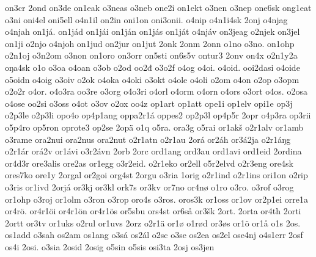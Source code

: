 {    on3cr
    2ond
    on3de
    on1eak
    o3neas
    o3neb
    one2i
    on1ekt
    o3nen
    o3nep
    one6sk
    ong1eat
    o3ni
    oni4el
    oni5ell
    o4n1il
    on2in
    oni1on
    oni3onii.
    o4nip
    o4n1i4sk
    2onj
    o4njag
    o4njah
    on1já.
    on1jád
    on1jái
    on1ján
    on1jás
    on1ját
    o4njáv
    on3jeag
    o2njek
    on3jel
    on1ji
    o2njo
    o4njoh
    on1jud
    on2jur
    on1jut
    2onk
    2onm
    2onn
    o1no
    o3no.
    on1ohp
    o2n1oj
    o3n2om
    o3non
    on1oro
    on3orr
    on5sti
    on6s5v
    ontur3
    2onv
    on4x
    o2n1y2a
    oŋa4sk
    o1o
    o3oa
    o4oan
    o3ob
    o2od
    oo2đ
    o3o2f
    o4og
    o4oi.
    o4oid.
    ooi2dasi
    o4oide
    o5oidn
    o4oig
    o3oiv
    o2ok
    o4oka
    o4oki
    o3okt
    o4ole
    o4oli
    o2om
    o4on
    o2op
    o3opm
    o2o2r
    o4or.
    o4o3ra
    oo3re
    o3org
    o4o3ri
    o4orl
    o4orm
    o4orn
    o4ors
    o3ort
    o4os.
    o2osa
    o4ose
    oo2si
    o3oss
    o4ot
    o3ov
    o2ox
    oo4z
    op1art
    op1att
    ope1i
    op1elv
    opi1e
    op3j
    o2p3le
    o2p3li
    opo4o
    op4p1ang
    oppa2r1á
    oppes2
    op2p3l
    op4p5r
    2opr
    o4p3ra
    op3rii
    o5p4ro
    op5ron
    oprote3
    op2se
    2opä
    o1q
    o5ra.
    ora3g
    o5rai
    or1akš
    o2r1alv
    or1amb
    o3rame
    ora2nui
    ora2nus
    ora2nut
    o2r1atn
    o2r1au
    2orá
    or2áh
    or3á2ja
    o2r1áŋg
    o2r1ár
    orá2v
    or1ávi
    o3r2ávn
    2orb
    2orc
    ord1ang
    ord3au
    ord1avi
    ord1eid
    2ordina
    or4d3r
    ore3alis
    ore2as
    or1egg
    o3r2eid.
    o2r1eko
    or2ell
    o5r2elvd
    o2r3eng
    ore4sk
    ores7ko
    ore1y
    2orgal
    or2goi
    org4st
    2orgu
    o3ria
    1orig
    o2r1ind
    o2r1ins
    ori1on
    o2rip
    o3ris
    or1ivd
    2orjá
    or3kj
    or3kl
    ork7s
    or3kv
    or7no
    or4nø
    o1ro
    o3ro.
    o3rof
    o3rog
    or1ohp
    o3roj
    or1olm
    o3ron
    o3rop
    oro4s
    o3ros.
    oros3k
    or1oss
    or1ov
    or2p1ei
    orre1a
    or4rö.
    or4r1öi
    or4r1ön
    or4r1ös
    or5sbu
    ors4st
    or6så
    or3šk
    2ort.
    2orta
    or4th
    2orti
    2ortt
    or3tv
    or1uks
    o2rul
    or1uvs
    2orz
    o2r1ä
    or1ø
    o1rød
    or3øs
    or1ö
    or1å
    o1s
    2os.
    os1add
    o3sah
    os2am
    os1ang
    o3sá
    os2ál
    o2sc
    o3se
    os2ea
    os2el
    ose4nj
    o4s1err
    2osf
    os4i
    2osi.
    o3sia
    2osid
    2osig
    o5sin
    o5sis
    osi3ta
    2osj
    os3jen
}
